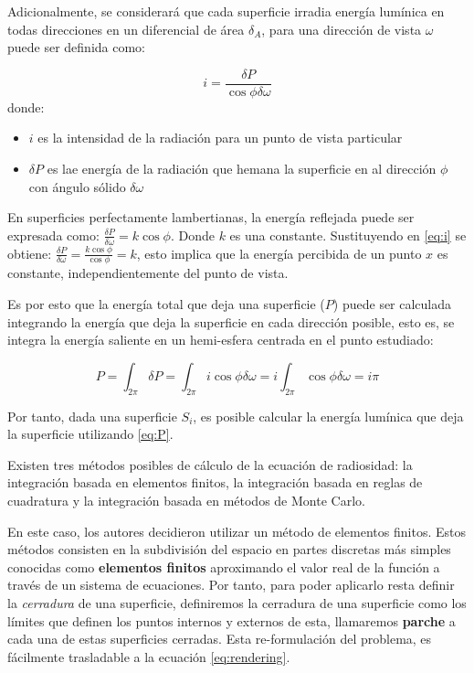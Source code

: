 Adicionalmente, se considerará que cada superficie irradia energía lumínica en todas direcciones en un diferencial de área $\delta_{A}$, para una dirección de vista $\omega$ puede ser definida como:

\begin{equation}
    i = \frac{\delta{P}}{\cos{\phi\delta\omega}} \label{eq:i}
\end{equation}
donde:
\begin{itemize}
    \item $i$ es la intensidad de la radiación para un punto de vista particular
    \item $\delta{P}$ es lae energía de la radiación que hemana la superficie en al dirección $\phi$ con ángulo sólido $\delta\omega$
\end{itemize}

En superficies perfectamente lambertianas, la energía reflejada puede ser expresada como: $\frac{\delta{P}}{\delta{\omega}} = k\cos{\phi}$. Donde $k$ es una constante.
Sustituyendo en \eqref{eq:i} se obtiene: $\frac{\delta{P}}{\delta{\omega}} = \frac{k\cos{\phi}}{\cos{\phi}} = k$, esto implica que la energía percibida de un punto $x$ 
es constante, independientemente del punto de vista.

Es por esto que la energía total que deja una superficie ($P$) puede ser calculada integrando la energía que deja la superficie en cada dirección posible, esto es, se integra la energía saliente en un hemi-esfera centrada en el punto estudiado:

\begin{equation}
    P = \int_{2\pi} \delta{P} = \int_{2\pi} i\cos{\phi}\delta{\omega} = i \int_{2\pi} \cos{\phi}\delta{\omega} = i\pi
    \label{eq:P}
\end{equation}

Por tanto, dada una superficie $S_{i}$, es posible calcular la energía lumínica que deja la superficie utilizando \eqref{eq:P}.

Existen tres métodos posibles de cálculo de la ecuación de radiosidad: la integración basada en elementos finitos, la integración basada en reglas de cuadratura y la integración basada en métodos de Monte Carlo.

En este caso, los autores decidieron utilizar un método de elementos finitos. Estos métodos consisten en la subdivisión del espacio en partes discretas más simples conocidas como \textbf{elementos finitos} aproximando el valor real de la función a través de un sistema de ecuaciones. Por tanto, para poder aplicarlo resta definir la \textit{cerradura} de una superficie, definiremos la cerradura de una superficie como los límites que definen los puntos internos y externos de esta, llamaremos \textbf{parche} a cada una de estas superficies cerradas. Esta re-formulación del problema, es fácilmente trasladable a la ecuación \eqref{eq:rendering}.


